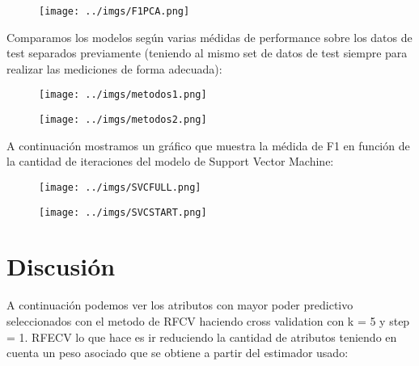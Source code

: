 \documentclass[10pt, a4paper]{article}
\begin{document}
\begin{figure}[H]
\centering
\texttt{[image: ../imgs/F1PCA.png]}
\end{figure}

Comparamos los modelos según varias médidas de performance sobre los datos de test separados previamente (teniendo al mismo set de datos de test siempre para realizar las mediciones de forma adecuada):
\begin{figure}[H]
\centering
\texttt{[image: ../imgs/metodos1.png]}
\end{figure}

\begin{figure}[H]
\centering
\texttt{[image: ../imgs/metodos2.png]}
\end{figure}
A continuación mostramos un gráfico que muestra la médida de F1 en función de la cantidad de iteraciones del modelo de Support Vector Machine:
\begin{figure}[H]
\centering
\texttt{[image: ../imgs/SVCFULL.png]}
\end{figure}

\begin{figure}[H]
\centering
\texttt{[image: ../imgs/SVCSTART.png]}
\end{figure}

%

\section{Discusión}

 A continuación podemos ver los atributos con mayor poder predictivo seleccionados con el metodo de RFCV haciendo cross validation con k = 5 y step = 1. RFECV lo que hace es ir reduciendo la cantidad de atributos teniendo en cuenta un peso asociado que se obtiene a partir del estimador usado:
\end{document}
